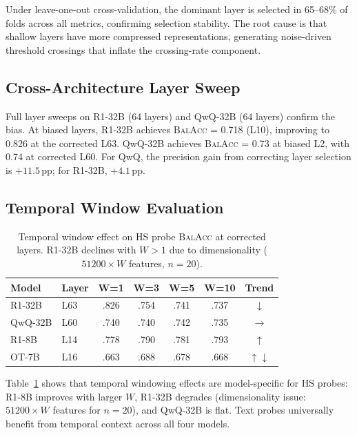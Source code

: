 \documentclass[11pt]{article}
\newcommand{\pp}{\,\text{pp}}
\newcommand{\balacc}{\textsc{BalAcc}}
\begin{document}
Under leave-one-out cross-validation, the dominant layer is selected in 65--68\% of folds across all metrics, confirming selection stability.
The root cause is that shallow layers have more compressed representations, generating noise-driven threshold crossings that inflate the crossing-rate component.

\subsection{Cross-Architecture Layer Sweep}
\label{sec:layer_sweep}

Full layer sweeps on R1-32B (64 layers) and QwQ-32B (64 layers) confirm the bias.
At biased layers, R1-32B achieves \balacc{} = 0.718 (L10), improving to 0.826 at the corrected L63.
QwQ-32B achieves \balacc{} = 0.73 at biased L2, with 0.74 at corrected L60.
For QwQ, the precision gain from correcting layer selection is $+11.5\pp$; for R1-32B, $+4.1\pp$.

\subsection{Temporal Window Evaluation}
\label{sec:temporal}

\begin{table}[t]
\centering
\small
\begin{tabular}{@{}llccccc@{}}
\toprule
\textbf{Model} & \textbf{Layer} & \textbf{W=1} & \textbf{W=3} & \textbf{W=5} & \textbf{W=10} & \textbf{Trend} \\
\midrule
R1-32B & L63 & .826 & .754 & .741 & .737 & $\downarrow$ \\
QwQ-32B & L60 & .740 & .740 & .742 & .735 & $\rightarrow$ \\
R1-8B & L14 & .778 & .790 & .781 & .793 & $\uparrow$ \\
OT-7B & L16 & .663 & .688 & .678 & .668 & $\uparrow\downarrow$ \\
\bottomrule
\end{tabular}
\caption{Temporal window effect on HS probe \balacc{} at corrected layers. R1-32B declines with $W > 1$ due to dimensionality ($51200 \times W$ features, $n=20$).}
\label{tab:temporal_window}
\end{table}

Table~\ref{tab:temporal_window} shows that temporal windowing effects are model-specific for HS probes: R1-8B improves with larger $W$, R1-32B degrades (dimensionality issue: $51200 \times W$ features for $n=20$), and QwQ-32B is flat.
Text probes universally benefit from temporal context across all four models.
\end{document}
